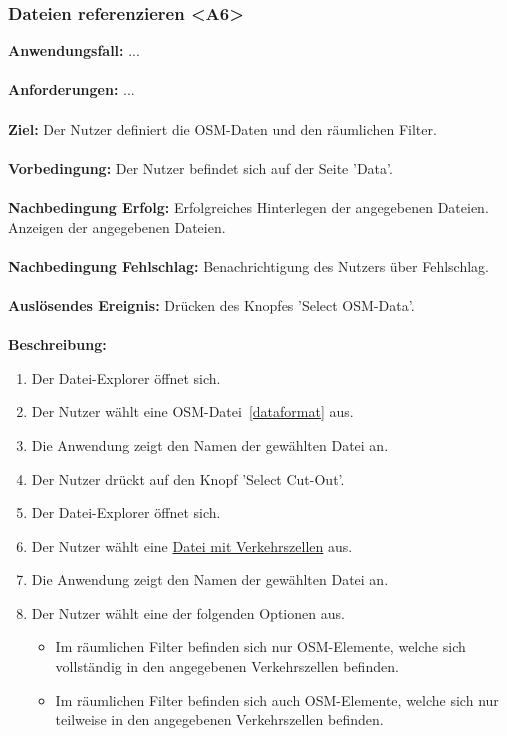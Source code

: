 \documentclass[parskip=full]{scrartcl} %
\begin{document}
\subsubsection*{Dateien referenzieren <A6>}
\textbf{Anwendungsfall:} ...\\\\
\textbf{Anforderungen:} ...\\\\
\textbf{Ziel:} Der Nutzer definiert die OSM-Daten und den räumlichen Filter.\\\\
\textbf{Vorbedingung:} Der Nutzer befindet sich auf der Seite 'Data'. \\\\
\textbf{Nachbedingung Erfolg:} Erfolgreiches Hinterlegen der angegebenen Dateien. Anzeigen der angegebenen Dateien.\\\\
\textbf{Nachbedingung Fehlschlag:} Benachrichtigung des Nutzers über Fehlschlag. \\\\
\textbf{Auslösendes Ereignis:} Drücken des Knopfes 'Select OSM-Data'.\\\\
\textbf{Beschreibung:}
\begin{enumerate}
    \item Der Datei-Explorer öffnet sich.
    \item Der Nutzer wählt eine {OSM-Datei}~\ref{dataformat} aus.
    \item Die Anwendung zeigt den Namen der gewählten Datei an.
    \item Der Nutzer drückt auf den Knopf 'Select Cut-Out'.
    \item Der Datei-Explorer öffnet sich.
    \item Der Nutzer wählt eine \hyperlink{dataformat}{Datei mit Verkehrszellen} aus.
    \item Die Anwendung zeigt den Namen der gewählten Datei an.
    \item Der Nutzer wählt eine der folgenden Optionen aus.
    \begin{itemize}
        \item Im räumlichen Filter befinden sich nur OSM-Elemente, welche sich vollständig in den angegebenen Verkehrszellen befinden.
        \item Im räumlichen Filter befinden sich auch OSM-Elemente, welche sich nur teilweise in den angegebenen Verkehrszellen befinden.
    \end{itemize}
\end{enumerate}
\newpage
\end{document}
